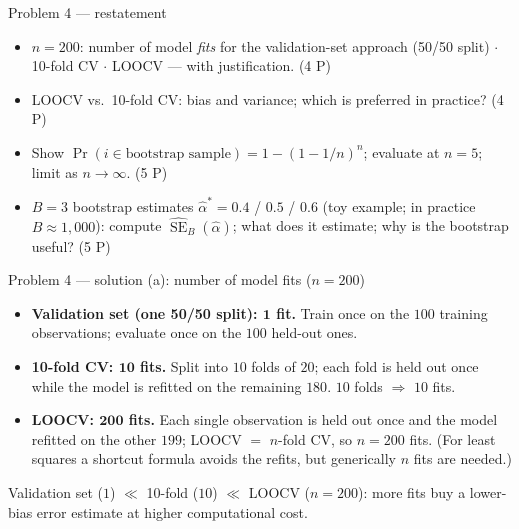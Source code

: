 \documentclass[aspectratio=169,11pt]{beamer}
\begin{document}
\begin{frame}{Problem 4 --- restatement}
  \begin{exercise}
    \begin{itemize}
      \item[(a)] $n=200$: number of model \emph{fits} for the validation-set approach
        (50/50 split) $\cdot$ 10-fold CV $\cdot$ LOOCV --- with justification. \hfill (4 P)
      \item[(b)] LOOCV vs.\ 10-fold CV: bias and variance; which is preferred in
        practice? \hfill (4 P)
      \item[(c)] Show $\Pr(i\in\text{bootstrap sample})=1-(1-1/n)^n$; evaluate at $n=5$;
        limit as $n\to\infty$. \hfill (5 P)
      \item[(d)] $B=3$ bootstrap estimates $\hat{\alpha}^{*}=0.4$ / $0.5$ / $0.6$
        (toy example; in practice $B\approx 1{,}000$): compute
        $\widehat{\operatorname{SE}}_B(\hat{\alpha})$; what does it estimate; why is the
        bootstrap useful? \hfill (5 P)
    \end{itemize}
  \end{exercise}
\end{frame}

\begin{frame}{Problem 4 --- solution (a): number of model fits ($n=200$)}
  \begin{solutionbox}
    \begin{itemize}
      \item[(i)] \textbf{Validation set (one 50/50 split): $\mathbf{1}$ fit.} Train once on
        the $100$ training observations; evaluate once on the $100$ held-out ones.
      \item[(ii)] \textbf{10-fold CV: $\mathbf{10}$ fits.} Split into $10$ folds of $20$;
        each fold is held out once while the model is refitted on the remaining $180$.
        $10$ folds $\Rightarrow$ $10$ fits.
      \item[(iii)] \textbf{LOOCV: $\mathbf{200}$ fits.} Each single observation is held out
        once and the model refitted on the other $199$; LOOCV $=$ $n$-fold CV, so $n=200$
        fits. (For least squares a shortcut formula avoids the refits, but generically $n$
        fits are needed.)
    \end{itemize}
  \end{solutionbox}
  \begin{takeaway}
    Validation set ($1$) $\ll$ 10-fold ($10$) $\ll$ LOOCV ($n=200$): more fits buy a
    lower-bias error estimate at higher computational cost.
  \end{takeaway}
\end{frame}
\end{document}
